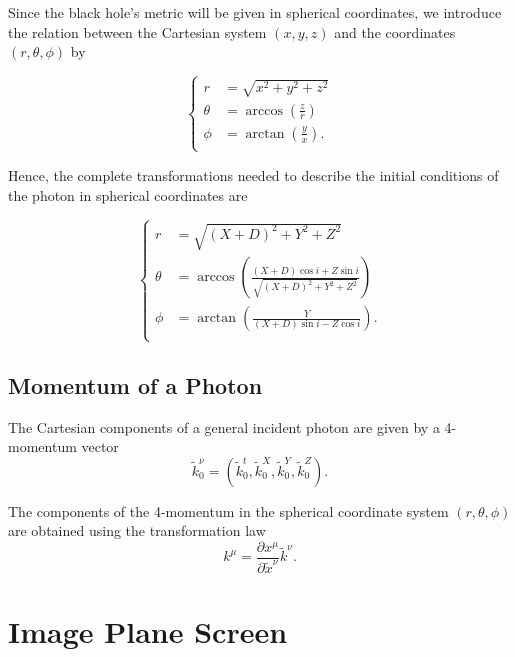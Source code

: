 Since the black hole's metric will be given in spherical coordinates, we introduce the relation between the Cartesian system $(x,y,z)$ and the coordinates $(r,\theta, \phi)$ by

\begin{equation}
\begin{cases}
r &= \sqrt{x^2 + y^2 + z^2} \\
\theta &= \arccos \left( \frac{z}{r}\right)\\
\phi &= \arctan \left( \frac{y}{x} \right) . \\
\end{cases}
\end{equation}

Hence, the complete transformations needed to describe the initial conditions of the photon in spherical coordinates are 

\begin{equation}
\begin{cases}
r &= \sqrt{(X+D)^2 + Y^2 + Z^2} \\
\theta &= \arccos \left( \frac{(X+D) \cos i + Z \sin i}{\sqrt{(X+D)^2 + Y^2 + Z^2}}\right)\\
\phi &= \arctan \left( \frac{Y}{(X+D)\sin i - Z \cos i} \right) . \\
\end{cases} \label{CoordinateTransformation}
\end{equation}

\subsection{Momentum of a Photon}

The Cartesian components of a general incident photon are given by a 4-momentum vector
\begin{equation}
\tilde{k}^\nu_0 =\left( \tilde{k}^t_0, \tilde{k}^X_0, \tilde{k}^Y_0, \tilde{k}^Z_0 \right).
\end{equation}

The components of the 4-momentum in the spherical coordinate system $(r,\theta,\phi)$ are obtained using the transformation law
\begin{equation}
k^\mu = \frac{\partial x^\mu}{\partial \tilde{x}^\nu} \tilde{k}^\nu.
\label{kTransformation}
\end{equation}



\section{Image Plane Screen}

